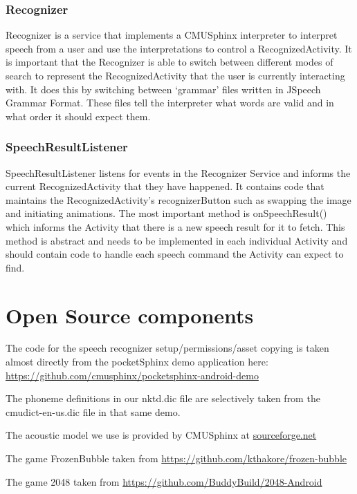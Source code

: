 \documentclass[11pt, oneside]{article}
\begin{document}
\subsubsection{Recognizer}
Recognizer is a service that implements a CMUSphinx interpreter to
interpret speech from a user and use the interpretations to control a
RecognizedActivity. It is important that the Recognizer is able to
switch between different modes of search to represent the
RecognizedActivity that the user is currently interacting with. It
does this by switching between `grammar' files written in JSpeech
Grammar Format. These files tell the interpreter what words are valid
and in what order it should expect them.

\subsubsection{SpeechResultListener}
SpeechResultListener listens for events in the Recognizer Service and
informs the current RecognizedActivity that they have happened. It
contains code that maintains the RecognizedActivity's recognizerButton
such as swapping the image and initiating animations. The most
important method is onSpeechResult() which informs the Activity that
there is a new speech result for it to fetch. This method is abstract
and needs to be implemented in each individual Activity and should
contain code to handle each speech command the Activity can expect to
find.

\section{Open Source components}

The code for the speech recognizer setup/permissions/asset copying is
taken almost directly from the pocketSphinx demo application here:
\url{https://github.com/cmusphinx/pocketsphinx-android-demo}

The phoneme definitions in our nktd.dic file are selectively taken
from the cmudict-en-us.dic file in that same demo.

The acoustic model we use is provided by CMUSphinx at
\href{https://sourceforge.net/projects/cmusphinx/files/Acoustic\%20and\%20Language\%20Models/US\%20English/}{sourceforge.net}

The game FrozenBubble taken from
\url{https://github.com/kthakore/frozen-bubble}

The game 2048 taken from
\url{https://github.com/BuddyBuild/2048-Android}
    
\end{document}

